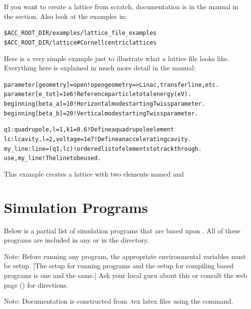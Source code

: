\documentclass{hitec}
\newenvironment{display}
  {\vspace*{-1.5ex} \begin{alltt}}
  {\end{alltt} \vspace*{-1.0ex}}
\begin{document}
If you want to create a \bmad lattice from scratch, documentation is in the \bmad manual
in the  section. Also look at the examples in:
\begin{display}
  \$ACC_ROOT_DIR/examples/lattice_file_examples
  \$ACC_ROOT_DIR/lattice           # Cornell centric lattices
\end{display}

Here is a very simple example just to illustrate what a lattice file looks
like. Everything here is explained in much more detail in the \bmad manual:
\begin{display}
  parameter[geometry] = open     ! open geometry => Linac, transfer line, etc.
  parameter[e_tot] = 1e6         ! Reference particle total energy (eV).
  beginning[beta_a] = 10         ! Horizontal mode starting Twiss parameter.
  beginning[beta_b] = 20         ! Vertical mode starting Twiss parameter.

  q1: quadrupole, l = 1, k1 = 0.6   ! Define a quadrupole element
  lc: lcavity, l = 2, voltage = 1e7 ! Define an accelerating cavity.
  my_line: line = (q1, lc)          ! ordered list of elements to track through.
  use, my_line                      ! The line to be used.
\end{display}
This example creates a lattice with two elements named  and 

\section{Simulation Programs}

Below is a partial list of simulation programs that are based upon \bmad. All of these
programs are included in any  or  in the 
directory.

Note: Before running any program, the appropriate environmental variables must be setup.
[The setup for running programs and the setup for compiling \bmad based programs is one
and the same.] Ask your local \bmad guru about this or consult the \bmad web page
() for directions.

Note: Documentation is constructed from .tex latex files using the  command.
\end{document}
